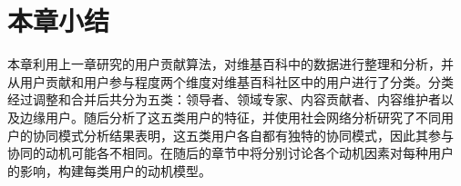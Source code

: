 \section{本章小结}
\label{sec:conclusion}

本章利用上一章研究的用户贡献算法，对维基百科中的数据进行整理和分析，并
从用户贡献和用户参与程度两个维度对维基百科社区中的用户进行了分类。分类
经过调整和合并后共分为五类：领导者、领域专家、内容贡献者、内容维护者以
及边缘用户。随后分析了这五类用户的特征，并使用社会网络分析研究了不同用
户的协同模式分析结果表明，这五类用户各自都有独特的协同模式，因此其参与
协同的动机可能各不相同。在随后的章节中将分别讨论各个动机因素对每种用户
的影响，构建每类用户的动机模型。
